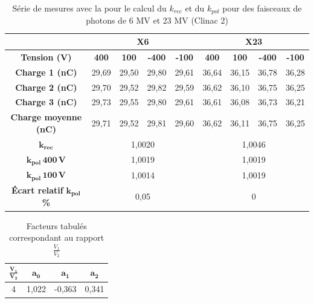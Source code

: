 \documentclass{article}
\begin{document}
\begin{table}[h]
  \centering
  \begin{tabular}{c|cccc|cccc|}
  \cline{2-9}
                                                     & \multicolumn{4}{c|}{\textbf{X6}} & \multicolumn{4}{c|}{\textbf{X23}} \\ \hline
  \multicolumn{1}{|c|}{\textbf{Tension (V)}} & \textbf{400} & \textbf{100} & \textbf{-400} & \textbf{-100} & \textbf{400} & \textbf{100} & \textbf{-400} & \textbf{-100} \\ \hline
  \multicolumn{1}{|c|}{\textbf{Charge 1 (nC)}}       & 29,69  & 29,50  & 29,80  & 29,61 & 36,64  & 36,15  & 36,78  & 36,28  \\
  \multicolumn{1}{|c|}{\textbf{Charge 2 (nC)}}       & 29,70   & 29,52  & 29,82  & 29,59 & 36,62  & 36,10  & 36,75  & 36,25  \\
  \multicolumn{1}{|c|}{\textbf{Charge 3 (nC)}}       & 29,73  & 29,55  & 29,80  & 29,61 & 36,61  & 36,08  & 36,73  & 36,21  \\
  \multicolumn{1}{|c|}{\textbf{Charge moyenne (nC)}} & 29,71  & 29,52  & 29,81  & 29,60 & 36,62  & 36,11  & 36,75  & 36,25  \\ \hline
  \multicolumn{1}{|c|}{$\mathbf{k_{rec}}$}                & \multicolumn{4}{c|}{1,0020}      & \multicolumn{4}{c|}{1,0046}       \\
  \multicolumn{1}{|c|}{$\mathbf{k_{pol} \, 400 \, V}$}          & \multicolumn{4}{c|}{1,0019}      & \multicolumn{4}{c|}{1,0019}       \\
  \multicolumn{1}{|c|}{$\mathbf{k_{pol} \, 100 \, V}$}          & \multicolumn{4}{c|}{1,0014}      & \multicolumn{4}{c|}{1,0019}       \\ 
  \multicolumn{1}{|c|}{\textbf{Écart relatif} $\mathbf{k_{pol}}$ \textbf{\%}} & \multicolumn{4}{c|}{0,05} & \multicolumn{4}{c|}{0} \\
  \hline
  \end{tabular}
  \caption{Série de mesures avec la  pour le calcul du $k_{rec}$ et du $k_{pol}$ pour des faisceaux de photons de 6 MV et 23 MV (Clinac 2)}
  \label{table_kpol}
\end{table}



\begin{table}[h]
  \centering
  \begin{tabular}{cccc}
    \toprule
    $\mathbf{\frac{V_1}{V_2}}$ & $\mathbf{a_0}$ & $\mathbf{a_1}$ & $\mathbf{a_2}$\\
    \toprule
    4 & 1,022 & -0,363 & 0,341\\
    \bottomrule    
  \end{tabular}
  \caption{Facteurs tabulés correspondant au rapport $\frac{V_1}{V_2}$}
  \label{table_facteurs_krec}
\end{table}
\end{document}
